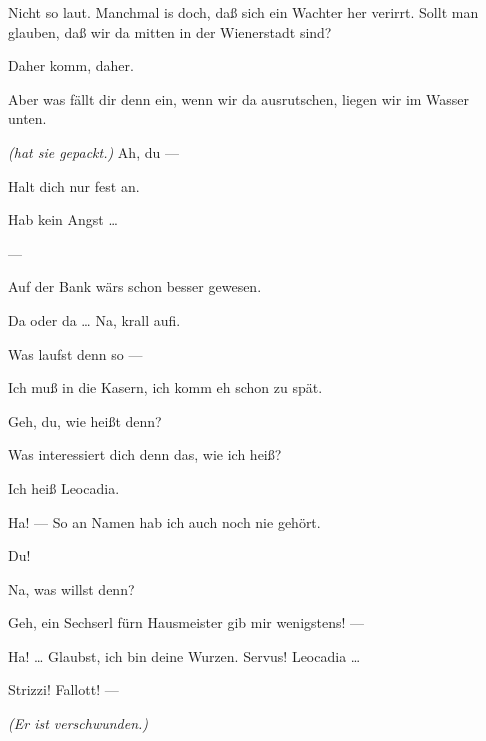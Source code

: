 \documentclass[
	final,
	a4paper,
	ngerman,
	mpinclude = true, %
	twoside = true,
	open = right,
	cleardoublepage = plain,
	DIV = 13,
	BCOR = 1cm,
	titlepage = firstiscover,
	]{scrbook}
\newcommand{\direction}[1]{\textit{(#1)}}
\newcommand{\hiat}{---}
\newcommand{\thecharacter}[1]{\textup{\textsc{#1}}}
\newcommand{\thedirne}{\thecharacter{Dirne}}
\newcommand{\thesoldat}{\thecharacter{Soldat}}
\newcommand{\character}[1]{\item[#1:]}
\newcommand{\dirne}{\character{\thedirne}}
\newcommand{\soldat}{\character{\thesoldat}}
\begin{document}
\begin{play}
	\dirne
	Nicht so laut. Manchmal is doch, daß sich ein Wachter her verirrt. Sollt man glauben, daß wir da mitten in der Wienerstadt sind?

	\soldat
	Daher komm, daher.

	\dirne
	Aber was fällt dir denn ein, wenn wir da ausrutschen, liegen wir im Wasser unten.

	\soldat
	\direction{hat sie gepackt.} Ah, du ---

	\dirne
	Halt dich nur fest an.

	\soldat
	Hab kein Angst \ldots{}

	\hiat

	\dirne
	Auf der Bank wärs schon besser gewesen.

	\soldat
	Da oder da \ldots{} Na, krall aufi.

	\dirne
	Was laufst denn so ---

	\soldat
	Ich muß in die Kasern, ich komm eh schon zu spät.

	\dirne
	Geh, du, wie heißt denn?

	\soldat
	Was interessiert dich denn das, wie ich heiß?

	\dirne
	Ich heiß Leocadia.

	\soldat
	Ha! --- So an Namen hab ich auch noch nie gehört.

	\dirne
	Du!

	\soldat
	Na, was willst denn?

	\dirne
	Geh, ein Sechserl fürn Hausmeister gib mir wenigstens! ---

	\soldat
	Ha! \ldots{} Glaubst, ich bin deine Wurzen. Servus! Leocadia \ldots{}

	\dirne
	Strizzi! Fallott! ---

	\direction{Er ist verschwunden.}

\end{play}
\end{document}
